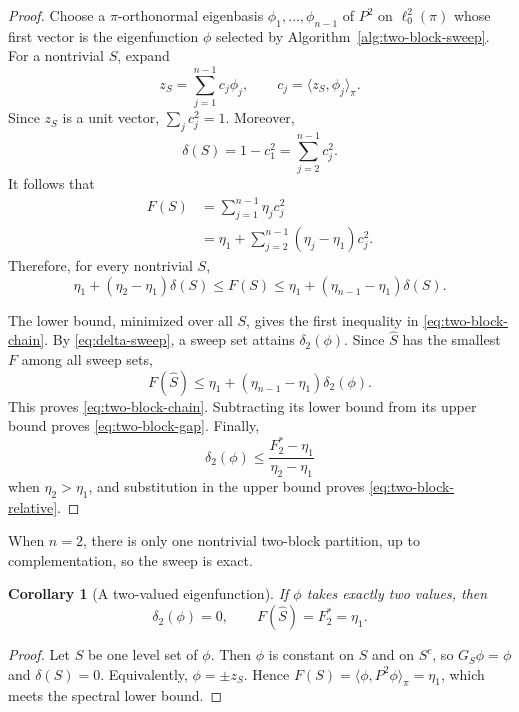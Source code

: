 \documentclass[11pt]{article}
\newtheorem{corollary}[theorem]{Corollary}
\newcommand{\1}{\mathbf{1}}
\begin{document}
\begin{proof}
Choose a $\pi$-orthonormal eigenbasis
$\phi_1,\ldots,\phi_{n-1}$ of $P^2$ on $\ell^2_0(\pi)$
whose first vector is the eigenfunction $\phi$ selected by
Algorithm~\ref{alg:two-block-sweep}.
For a nontrivial $S$, expand
\[
    z_S=\sum_{j=1}^{n-1}c_j\phi_j,
    \qquad
    c_j=\langle z_S,\phi_j\rangle_\pi.
\]
Since $z_S$ is a unit vector, $\sum_jc_j^2=1$.  Moreover,
\[
    \delta(S)=1-c_1^2=\sum_{j=2}^{n-1}c_j^2.
\]
It follows that
\begin{align*}
    F(S)
    &=\sum_{j=1}^{n-1}\eta_jc_j^2\\
    &=\eta_1+
      \sum_{j=2}^{n-1}(\eta_j-\eta_1)c_j^2.
\end{align*}
Therefore, for every nontrivial $S$,
\begin{equation*}
    \eta_1+(\eta_2-\eta_1)\delta(S)
    \leq F(S)
    \leq
    \eta_1+(\eta_{n-1}-\eta_1)\delta(S).
\end{equation*}

The lower bound, minimized over all $S$, gives the first inequality in
\eqref{eq:two-block-chain}.  By \eqref{eq:delta-sweep}, a sweep set
attains $\delta_2(\phi)$.  Since $\widehat S$ has the smallest $F$
among all sweep sets,
\[
    F(\widehat S)
    \leq\eta_1+(\eta_{n-1}-\eta_1)\delta_2(\phi).
\]
This proves \eqref{eq:two-block-chain}.  Subtracting its lower bound
from its upper bound proves \eqref{eq:two-block-gap}.  Finally,
\[
    \delta_2(\phi)
    \leq\frac{F_2^*-\eta_1}{\eta_2-\eta_1}
\]
when $\eta_2>\eta_1$, and substitution in the upper bound proves
\eqref{eq:two-block-relative}.
\end{proof}

When $n=2$, there is only one nontrivial two-block partition, up to
complementation, so the sweep is exact.

\begin{corollary}[A two-valued eigenfunction]
\label{cor:two-valued}
If $\phi$ takes exactly two values, then
\[
    \delta_2(\phi)=0,
    \qquad
    F(\widehat S)=F_2^*=\eta_1.
\]
\end{corollary}

\begin{proof}
Let $S$ be one level set of $\phi$.  Then $\phi$ is constant on $S$
and on $S^c$, so $G_S\phi=\phi$ and $\delta(S)=0$.  Equivalently,
$\phi=\pm z_S$.  Hence
$F(S)=\langle\phi,P^2\phi\rangle_\pi=\eta_1$,
which meets the spectral lower bound.
\end{proof}
\end{document}
